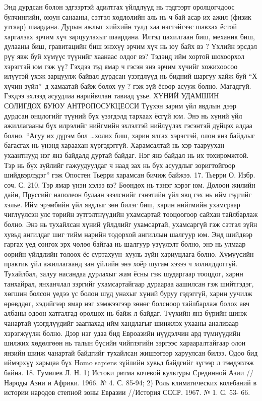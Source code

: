 Энд дурдсан болон эдгээртэй адилтгах үйлдлүүд нь тэдгээрт оролцогчдоос булчингийн, оюун санааны, сэтгэл хөдлөлийн аль нь ч бай асар их ажил (физик утгаар) шаардана. Дурын ажлыг хийхийн тулд хаа нэгтэйгээс шавхах ёстой харгалзах эрчим хүч зарцуулахыг шаардана. Илтэд цахилгаан биш, механик биш, дулааны биш, гравитацийн биш энэхүү эрчим хүч нь юу байх вэ ? Үхлийн эрсдэл рүү явж буй хүмүүс түүнийг хаанаас олдог вэ? Тэдэнд ийм хортой шохоорхол хэрэгтэй юм гэж үү? Гэхдээ тэд ямар ч гэсэн энэ эрчим хүчийг хожихоосоо илүүтэй үхэж зарцуулж байвал дурдсан үзэгдлүүд нь бидний шаргуу хайж буй “Х хүчин зүйл”–д хамаатай байж болох уу ? гэж зүй ёсоор асууж болно. Магадгүй. Гэхдээ эхлээд асуудлаа нарийвчлан тавиад үзье.
ХҮНИЙ УДАМШИН СОЛИГДОХ БУЮУ АНТРОПОСУКЦЕССИ
Түүхэн зарим үйл явдлын дээр дурдсан онцлогийг түүний бүх үзэгдэлд тархаах ёсгүй юм. Энэ нь хүний үйл ажиллагааны бүх илрэлийг нийгмийн эхлэлтэй нийлүүлэх гэсэнтэй дүйцэх алдаа болно. “Агуу их дүрэм бол …холих биш, харин ялгах хэрэгтэй, олон янз байдлыг багасгах нь үнэнд хараахан хүргэдэггүй. Харамсалтай нь хэр тааруухан ухаантнууд нэг янз байдалд дуртай байдаг. Нэг янз байдал нь их тохиромжтой. Тэр нь бүх зүйлийг гажуудуулдаг ч наад зах нь бүх асуудлыг зоригтойгоор шийдвэрлэдэг” гэж Опостен Тьерри харамсан бичиж байжээ. 17. Тьерри О. Избр. соч. С. 210.
Тэр ямар үнэн хэлээ вэ? Бөөндөх нь тэнэг хэрэг юм. Долоон жилийн дайн, Пруссийг наполеон булаан эзэлснийг гэнэтийн үйл явц гэх нь ийм гэдгийг хэлье. Ийм эрэмбийн үйл явдлыг зөн билэг биш, харин нийгмийн ухамсраар чиглүүлсэн улс төрийн зүтгэлтнүүдийн ухамсартай тооцоогоор сайхан тайлбарлаж болно. Энэ нь тухайлсан хүний үйлдлийг ухамсартай, ухамсаргүй гэж сэтгэл зүйн хувьд ангилдаг шиг тийм нарийн тодорхой ангиллын шалгуур юм. Энд шийдвэр гаргах үед сонгох эрх чөлөө байгаа нь шалгуур үзүүлэлт болно, энэ нь улмаар өөрийн үйлдлийн төлөөх ёс суртахуун–хууль зүйн хариуцлага болно. Хүмүүсийн практик үйл ажиллагаанд зан үйлийн энэ хоёр шугам хэзээ ч холилддоггүй. Тухайлбал, залуу насандаа дурлахыг жам ёсны гэж шударгаар тооцдог, харин танхайрал, янханчлал зэргийг ухамсартайгаар дураараа аашилсан гэж шийтгэдэг, хөгшин болсон үедээ үс болон шүд унахыг хүний буруу гэдэггүй, харин уучилж өрөвддөг, хэдийгээр ямар нэг хэмжээгээр зөнөг болсноор тайлбарлаж болох авч албаны өдөөн хатгалгад оролцох нь байж л байдаг. Түүхийн янз бүрийн шинж чанартай үзэгдлүүдийг зааглахад ийм хандлагыг шинжлэх ухааны анализаар хэрэгжүүлж болно. Дээр нэг удаа бид Евроазийн нүүдэлчин ард түмнүүдийн шилжих хөдөлгөөн нь талын бүсийн чийглэгийн зэргээс харааралтайгаар олон янзийн шинж чанартай байдгийг тухайлсан жишээгээр харуулсан билээ. Одоо бид иймэрхүү харьцаа бүх Homo sapiens зүйлийн хувьд байдгийг зүгээр л тэмдэглэж байна. 18. Гумилев Л. Н. 1) Истоки ритма кочевой культуры Срединной Азии //Народы Азии и Африки. 1966. № 4. С. 85-94; 2) Роль климатических колебаний в истории народов степной зоны Евразии //История СССР. 1967. № 1. С. 53- 66.
